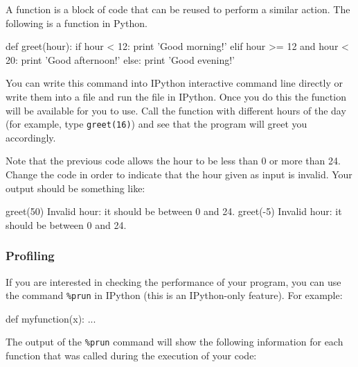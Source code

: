 A function is a block of code that can be reused to perform a similar action. The following is a function in Python. 

\begin{python}
def greet(hour):
    if hour < 12:
        print 'Good morning!'
    elif hour >= 12 and hour < 20:
        print 'Good afternoon!'
    else:
        print 'Good evening!'
\end{python}

You can write this command into IPython interactive command line directly or write them into a file and run the file in IPython. Once you do this the function will be available for you to use. Call the function  with different hours of the day (for example, type \texttt{greet(16)}) and see that the program will greet you accordingly.

\begin{exercise}
Note that the previous code allows the hour to be less than 0 or more than 24. Change the code in order to indicate that the hour given as input is invalid. Your output should be something like:

\begin{python}
greet(50)
Invalid hour: it should be between 0 and 24.
greet(-5)
Invalid hour: it should be between 0 and 24.
\end{python}

\end{exercise}

\subsubsection{Profiling}

If you are interested in checking the performance of your program, you can use the command \texttt{\%prun} in IPython (this is an IPython-only feature). For example:

\begin{python}
def myfunction(x):
    ...

\end{python}

The output of the \texttt{\%prun} command will show the following information for each function that was called during the execution of your code:

